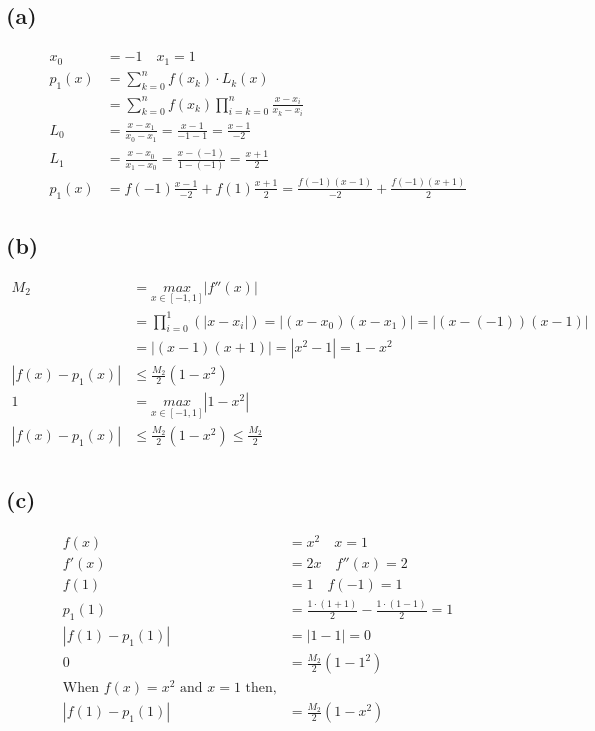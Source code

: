 \documentclass{article}
\begin{document}
\subsection*{(a)}
\begin{align*}
    x_0 &= -1 \quad x_1=1\\
    p_1(x) &= \sum_{k=0}^n f(x_k) \cdot L_k(x) \\
    &= \sum_{k=0}^n f(x_k) \prod_{i=k=0}^{n} \frac{x-x_i}{x_k - x_i}\\
    L_0 &=  \frac{x-x_1}{x_0 - x_1} = \frac{x-1}{-1-1} =\frac{x-1}{-2}\\
    L_1 &=   \frac{x-x_0}{x_1 - x_0} = \frac{x-(-1)}{1-(-1)} =\frac{x+1}{2}\\
    p_1(x) &= f(-1) \frac{x-1}{-2}+ f(1) \frac{x+1}{2} = \frac{f(-1)(x-1)}{-2}+  \frac{f(-1)(x+1)}{2}
\end{align*}

\subsection*{(b)}

\begin{align*}
    M_2 &= \underset{x \in [-1,1]}{max} |f''(x)| \\
    &= \prod_{i=0}^1 (|x-x_i|) = |(x-x_0)(x-x_1)| = |(x-(-1))(x-1)|\\
    &= |(x-1)(x+1)| = |x^2-1|=1-x^2\\
    |f(x)-p_1(x)| & \le \frac{M_2}{2}(1-x^2)\\
    1 &= \underset{x \in [-1,1]}{max} |1-x^2| \\
    |f(x)-p_1(x)| & \le \frac{M_2}{2}(1-x^2) \le \frac{M_2}{2}\\
\end{align*}

\subsection*{(c)}
\begin{align*}
    f(x)&= x^2 \quad x=1 \\
    f'(x) &= 2x \quad f''(x) = 2 \\
    f(1) &= 1 \quad f(-1)=1 \\
    p_1(1) &= \frac{1 \cdot (1+1)}{2} - \frac{1 \cdot (1-1)}{2}=1\\
    |f(1)-p_1(1)| &= |1-1 | =0\\
    0 &= \frac{M_2}{2} (1-1^2)\\
    \text{When $f(x)=x^2$ and $x=1$ then,}&\\
    |f(1)-p_1(1)| &= \frac{M_2}{2} (1-x^2)
\end{align*}
\end{document}

